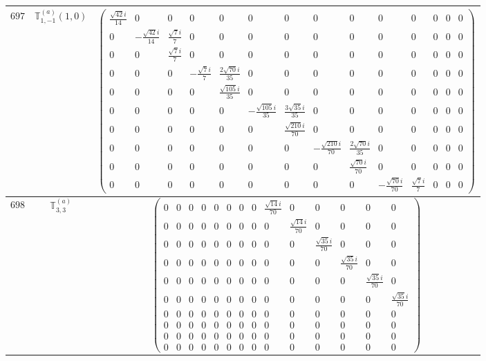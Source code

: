 \documentclass[fleqn,8pt,landscape]{jsarticle}
\begin{document}
\begin{center}
\begin{longtable}{ccc}
$ 697 $ & $ \mathbb{T}_{1,-1}^{(a)}(1,0) $ & $ \begin{pmatrix} \frac{\sqrt{42} i}{14} & 0 & 0 & 0 & 0 & 0 & 0 & 0 & 0 & 0 & 0 & 0 & 0 & 0 \\ 0 & - \frac{\sqrt{42} i}{14} & \frac{\sqrt{7} i}{7} & 0 & 0 & 0 & 0 & 0 & 0 & 0 & 0 & 0 & 0 & 0 \\ 0 & 0 & \frac{\sqrt{7} i}{7} & 0 & 0 & 0 & 0 & 0 & 0 & 0 & 0 & 0 & 0 & 0 \\ 0 & 0 & 0 & - \frac{\sqrt{7} i}{7} & \frac{2 \sqrt{70} i}{35} & 0 & 0 & 0 & 0 & 0 & 0 & 0 & 0 & 0 \\ 0 & 0 & 0 & 0 & \frac{\sqrt{105} i}{35} & 0 & 0 & 0 & 0 & 0 & 0 & 0 & 0 & 0 \\ 0 & 0 & 0 & 0 & 0 & - \frac{\sqrt{105} i}{35} & \frac{3 \sqrt{35} i}{35} & 0 & 0 & 0 & 0 & 0 & 0 & 0 \\ 0 & 0 & 0 & 0 & 0 & 0 & \frac{\sqrt{210} i}{70} & 0 & 0 & 0 & 0 & 0 & 0 & 0 \\ 0 & 0 & 0 & 0 & 0 & 0 & 0 & - \frac{\sqrt{210} i}{70} & \frac{2 \sqrt{70} i}{35} & 0 & 0 & 0 & 0 & 0 \\ 0 & 0 & 0 & 0 & 0 & 0 & 0 & 0 & \frac{\sqrt{70} i}{70} & 0 & 0 & 0 & 0 & 0 \\ 0 & 0 & 0 & 0 & 0 & 0 & 0 & 0 & 0 & - \frac{\sqrt{70} i}{70} & \frac{\sqrt{7} i}{7} & 0 & 0 & 0 \end{pmatrix} $ \\ \hline
$ 698 $ & $ \mathbb{T}_{3,3}^{(a)} $ & $ \begin{pmatrix} 0 & 0 & 0 & 0 & 0 & 0 & 0 & 0 & \frac{\sqrt{14} i}{70} & 0 & 0 & 0 & 0 & 0 \\ 0 & 0 & 0 & 0 & 0 & 0 & 0 & 0 & 0 & \frac{\sqrt{14} i}{70} & 0 & 0 & 0 & 0 \\ 0 & 0 & 0 & 0 & 0 & 0 & 0 & 0 & 0 & 0 & \frac{\sqrt{35} i}{70} & 0 & 0 & 0 \\ 0 & 0 & 0 & 0 & 0 & 0 & 0 & 0 & 0 & 0 & 0 & \frac{\sqrt{35} i}{70} & 0 & 0 \\ 0 & 0 & 0 & 0 & 0 & 0 & 0 & 0 & 0 & 0 & 0 & 0 & \frac{\sqrt{35} i}{70} & 0 \\ 0 & 0 & 0 & 0 & 0 & 0 & 0 & 0 & 0 & 0 & 0 & 0 & 0 & \frac{\sqrt{35} i}{70} \\ 0 & 0 & 0 & 0 & 0 & 0 & 0 & 0 & 0 & 0 & 0 & 0 & 0 & 0 \\ 0 & 0 & 0 & 0 & 0 & 0 & 0 & 0 & 0 & 0 & 0 & 0 & 0 & 0 \\ 0 & 0 & 0 & 0 & 0 & 0 & 0 & 0 & 0 & 0 & 0 & 0 & 0 & 0 \\ 0 & 0 & 0 & 0 & 0 & 0 & 0 & 0 & 0 & 0 & 0 & 0 & 0 & 0 \end{pmatrix} $ \\ \hline

\end{longtable}
\end{center}
\end{document}
